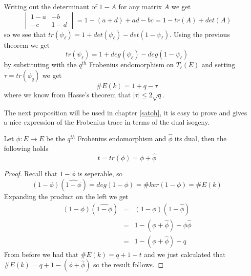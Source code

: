 Writing out the determinant of $1-A$ for any matrix $A$ we get
$$ \begin{vmatrix} 1-a & -b \\ -c & 1-d \end{vmatrix} = 1-(a+d)+ad-bc = 1-tr(A)+det(A) $$
so we see that $tr(\psi_\ell) = 1 + det(\psi_\ell) - det(1-\psi_\ell)$. Using the previous theorem we
get $$tr(\psi_\ell) = 1 + deg(\psi_\ell) - deg(1-\psi_\ell)$$ by substituting with the $q^{th}$ 
Frobenius endomorphism on $T_\ell(E)$ and setting $\tau = tr(\phi_q)$ we get
$$\#E(k) = 1 + q - \tau$$
where we know from Hasse's theorem that $|\tau| \leq 2\sqrt{q}$.

The next proposition will be used in chapter \ref{satoh}, it is easy to prove and gives a nice
expression of the Frobenius trace in terms of the dual isogeny.

\begin{prop}
 Let $\phi: E \rightarrow E$ be the $q^{th}$ Frobenius endomorphism and $\widehat{\phi}$ its dual, then
the following holds
$$ t = tr(\phi) = \phi + \widehat{\phi}$$
\end{prop}
\begin{proof}
 Recall that $1-\phi$ is seperable, so $$(1-\phi)(\widehat{1-\phi}) = deg(1-\phi) = \#ker(1-\phi) = \#E(k)$$
Expanding the product on the left we get
\begin{eqnarray}
 (1-\phi)(\widehat{1-\phi}) &=& (1-\phi)(1-\widehat{\phi}) \nonumber \\
			    &=& 1 - (\phi + \widehat{\phi}) + \phi\widehat{\phi} \nonumber \\
			    &=& 1 - (\phi + \widehat{\phi}) + q \nonumber
\end{eqnarray}
From before we had that $\#E(k) = q + 1 - t$ and we just calculated that $\#E(k) = q + 1 - (\phi +\widehat{\phi})$ so
the result follows.
\end{proof}

